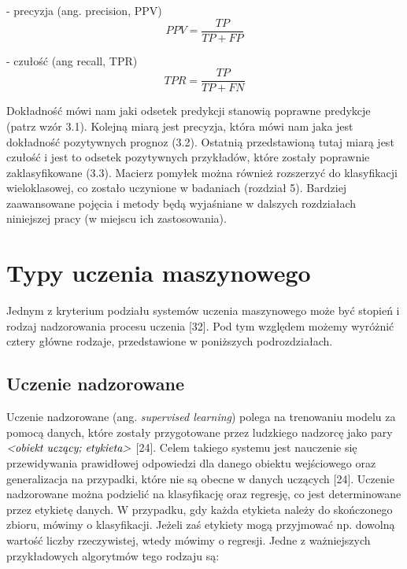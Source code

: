 - precyzja (ang. precision, PPV)
\begin{equation}
PPV=\frac {TP} {TP+FP}
\end{equation}

- czułość (ang recall, TPR)
\begin{equation}
TPR=\frac {TP} {TP+FN}
\end{equation}

\noindent Dokładność mówi nam jaki odsetek predykcji stanowią poprawne predykcje (patrz wzór 3.1). Kolejną miarą jest precyzja, która mówi nam jaka jest dokładność pozytywnych prognoz (3.2). Ostatnią przedstawioną tutaj miarą jest czułość i jest to odsetek pozytywnych przykładów, które zostały poprawnie zaklasyfikowane (3.3). Macierz pomyłek można również rozszerzyć do klasyfikacji wieloklasowej, co zostało uczynione w badaniach (rozdział 5). Bardziej zaawansowane pojęcia i metody będą wyjaśniane w dalszych rozdziałach niniejszej pracy (w miejscu ich zastosowania).

\section{Typy uczenia maszynowego}
\label{cha:cha3.2}

Jednym z kryterium podziału systemów uczenia maszynowego może być stopień i rodzaj nadzorowania procesu uczenia [32]. Pod tym względem możemy wyróżnić cztery główne rodzaje, przedstawione w poniższych podrozdziałach.

\subsection{Uczenie nadzorowane}
\label{cha:cha3.2.1}

Uczenie nadzorowane (ang. \textit{supervised learning}) polega na trenowaniu modelu za pomocą danych, które zostały przygotowane przez ludzkiego nadzorcę jako pary $\hbox{\it <obiekt~uczący; etykieta>}$ [24]. Celem takiego systemu jest nauczenie się przewidywania prawidłowej odpowiedzi dla danego obiektu wejściowego oraz generalizacja na przypadki, które nie są obecne w danych uczących [24]. 
Uczenie nadzorowane można podzielić na klasyfikację oraz regresję, co jest determinowane przez etykietę danych. W przypadku, gdy każda etykieta należy do skończonego zbioru, mówimy o klasyfikacji. Jeżeli zaś etykiety mogą przyjmować np. dowolną wartość liczby rzeczywistej, wtedy mówimy o regresji. Jedne z ważniejszych przykładowych algorytmów tego rodzaju są:

